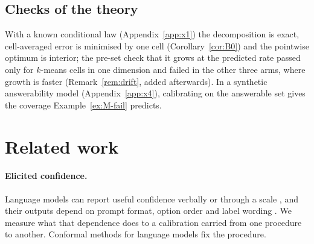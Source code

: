 \documentclass[11pt]{article}
\theoremstyle{definition}
\theoremstyle{remark}
\newcommand{\1}{\mathbf{1}}
\begin{document}
\subsection{Checks of the theory}
With a known conditional law (Appendix~\ref{app:x1}) the decomposition is exact, cell-averaged error is
minimised by one cell (Corollary~\ref{cor:B0}) and the pointwise optimum is interior; the pre-set check that it
grows at the predicted rate passed only for $k$-means cells in one dimension and failed in the other three
arms, where growth is faster (Remark~\ref{rem:drift}, added afterwards). In a synthetic answerability model
(Appendix~\ref{app:x4}), calibrating on the answerable set gives the coverage Example~\ref{ex:M-fail} predicts.

\section{Related work}
\label{sec:related}
\paragraph{Elicited confidence.} Language models can report useful confidence verbally or through a scale
\citep{kadavath2022language,lin2022teaching,tian2023just,xiong2024can}, and their outputs depend on prompt format,
option order and label wording \citep{zhao2021calibrate,sclar2024quantifying,zheng2024large}. We measure what that
dependence does to a calibration carried from one procedure to another. Conformal methods for language models
\citep{quach2024conformal,mohri2024language,cherian2024large} fix the procedure.

\end{document}
